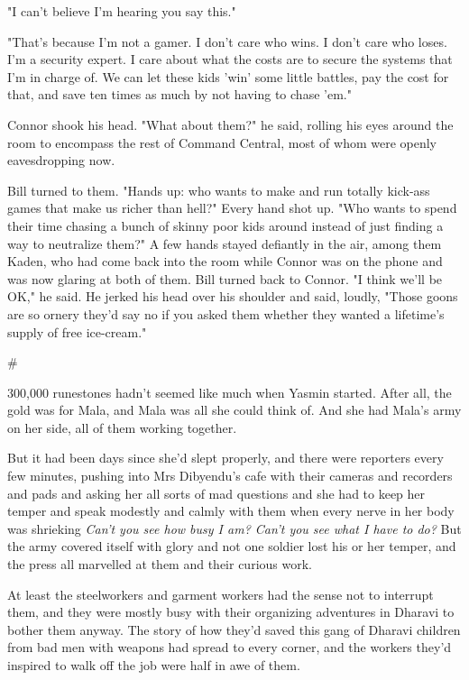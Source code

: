 "I can't believe I'm hearing you say this."

"That's because I'm not a gamer. I don't care who wins. I don't
care who loses. I'm a security expert. I care about what the costs
are to secure the systems that I'm in charge of. We can let these
kids 'win' some little battles, pay the cost for that, and save ten
times as much by not having to chase 'em."

Connor shook his head. "What about them?" he said, rolling his eyes
around the room to encompass the rest of Command Central, most of
whom were openly eavesdropping now.

Bill turned to them. "Hands up: who wants to make and run totally
kick-ass games that make us richer than hell?" Every hand shot up.
"Who wants to spend their time chasing a bunch of skinny poor kids
around instead of just finding a way to neutralize them?" A few
hands stayed defiantly in the air, among them Kaden, who had come
back into the room while Connor was on the phone and was now
glaring at both of them. Bill turned back to Connor. "I think we'll
be OK," he said. He jerked his head over his shoulder and said,
loudly, "Those goons are so ornery they'd say no if you asked them
whether they wanted a lifetime's supply of free ice-cream."

\#

300,000 runestones hadn't seemed like much when Yasmin started.
After all, the gold was for Mala, and Mala was all she could think
of. And she had Mala's army on her side, all of them working
together.

But it had been days since she'd slept properly, and there were
reporters every few minutes, pushing into Mrs Dibyendu's cafe with
their cameras and recorders and pads and asking her all sorts of
mad questions and she had to keep her temper and speak modestly and
calmly with them when every nerve in her body was shrieking
\emph{Can't you see how busy I am? Can't you see what I have to do?}
But the army covered itself with glory and not one soldier lost his
or her temper, and the press all marvelled at them and their
curious work.

At least the steelworkers and garment workers had the sense not to
interrupt them, and they were mostly busy with their organizing
adventures in Dharavi to bother them anyway. The story of how
they'd saved this gang of Dharavi children from bad men with
weapons had spread to every corner, and the workers they'd inspired
to walk off the job were half in awe of them.

